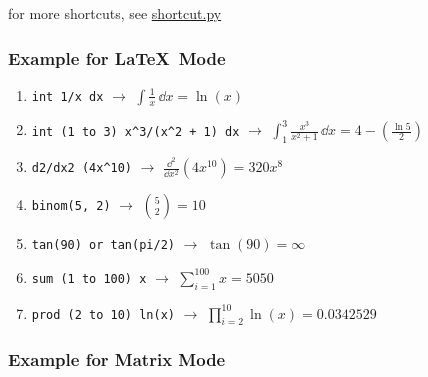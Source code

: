 \documentclass{article}
\begin{document}
for more shortcuts, see \href{https://github.com/Goge052215/MATLAB-Calculator-on-py/blob/master/latex_pack/shortcut.py}{shortcut.py}

\subsubsection{Example for \LaTeX \, Mode}

\noindent

\begin{enumerate}
\def\labelenumi{\arabic{enumi}.}
\item
  \texttt{int\ 1/x\ dx} \(\rightarrow\)
  \(\displaystyle \int \frac{1}{x} \, \dd x = \ln(x)\)
\item
  \texttt{int\ (1\ to\ 3)\ x\^{}3/(x\^{}2\ +\ 1)\ dx} \(\rightarrow\)
  \(\displaystyle \int_{1}^{3} \frac{x^3}{x^2 + 1} \, \dd x = 4 - \left(\frac{\ln 5}{2}\right)\)
\item
  \texttt{d2/dx2\ (4x\^{}10)} \(\rightarrow\)
  \(\displaystyle \frac{\dd^2}{\dd x^2} (4x^{10}) = 320x^8\)
\item
  \texttt{binom(5,\ 2)} \(\rightarrow\)
  \(\displaystyle \binom{5}{2} = 10\)
\item
  \texttt{tan(90)\ or\ tan(pi/2)} \(\rightarrow\) \(\tan(90) = \infty\)
\item
  \texttt{sum\ (1\ to\ 100)\ x} \(\rightarrow\)
  \(\displaystyle \sum_{i = 1}^{100} x = 5050\)
\item
  \texttt{prod\ (2\ to\ 10)\ ln(x)} \(\rightarrow\)
  \(\displaystyle \prod_{i = 2}^{10} \ln(x) = 0.0342529\)
\end{enumerate}

\hfill

\subsubsection{Example for Matrix Mode}

\noindent

\renewcommand{\arraystretch}{1.0}
\end{document}
